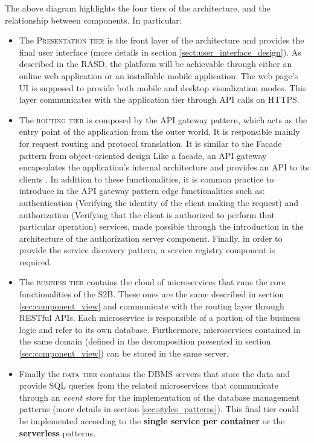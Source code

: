 The above diagram highlights the four tiers of the architecture, and the relationship between components. In particular:
\begin{itemize}
    \item The \textsc{Presentation tier} is the front layer of the architecture and provides the final user interface (more details in section \ref{sect:user_interface_design}). As described in the RASD, the platform will be achievable through either an online web application or an installable mobile application. The web page's UI is supposed to provide both mobile and desktop visualization modes. This layer communicates with the application tier through API calls on HTTPS.
    \item The \textsc{routing tier} is composed by the API gateway pattern, which acts as the entry point of the application from the outer world. It is responsible mainly for request routing and protocol translation. It is similar to the Facade pattern from object-oriented design Like a facade, an API gateway encapsulates the application’s internal architecture and provides an API to its clients \cite{richardson2018microservices}. In addition to these functionalities, it is common practice to introduce in the API gateway pattern edge functionalities such as: authentication (Verifying the identity of the client making the request) and authorization (Verifying that the client is authorized to perform that particular operation) services, made possible through the introduction in the architecture of the authorization server component. Finally, in order to provide the service discovery pattern, a service registry component is required.
    \item The \textsc{business tier} contains the cloud of microservices that runs the core functionalities of the S2B. These ones are the same described in section \ref{sec:component_view} and communicate with the routing layer through RESTful APIs. Each microservice is responsible of a portion of the business logic and refer to its own database. Furthermore, microservices contained in the same domain (defined in the decomposition presented in section \ref{sec:component_view}) can be stored in the same server.
    \item Finally the \textsc{data tier} contains the DBMS servers that store the data and provide SQL queries from the related microservices that communicate through an \textit{event store} for the implementation of the database management patterns (more details in section \ref{sec:styles_patterns}). This final tier could be implemented according to the \textbf{single service per container} or the \textbf{serverless} patterns.
\end{itemize}
